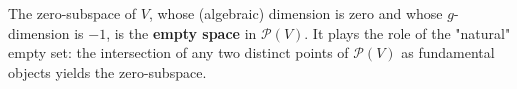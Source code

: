 The zero-subspace of $V$, whose (algebraic) dimension is zero and whose $g$-dimension is $-1$, is the \textbf{empty space} in $\mathcal{P}(V)$. It plays the role of the "natural" empty set: the intersection of any two distinct points of $\mathcal{P}(V)$ as fundamental objects yields the zero-subspace.
